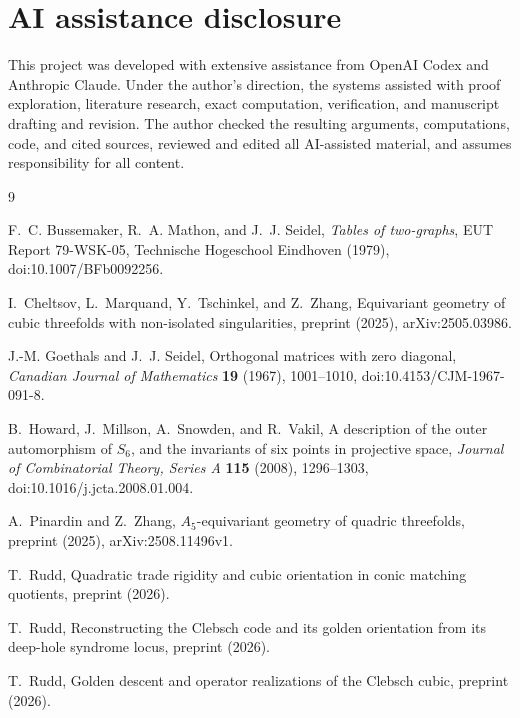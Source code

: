 \documentclass[11pt]{article}
\theoremstyle{definition}
\theoremstyle{remark}
\begin{document}
\section*{AI assistance disclosure}

This project was developed with extensive assistance from OpenAI Codex and
Anthropic Claude. Under the author's direction, the systems assisted with
proof exploration, literature research, exact computation, verification,
and manuscript drafting and revision. The author checked the resulting
arguments, computations, code, and cited sources, reviewed and edited all
AI-assisted material, and assumes responsibility for all content.

\begin{thebibliography}{9}

F.~C. Bussemaker, R.~A. Mathon, and J.~J. Seidel,
\newblock \emph{Tables of two-graphs},
\newblock EUT Report 79-WSK-05, Technische Hogeschool Eindhoven (1979),
doi:10.1007/BFb0092256.

I.~Cheltsov, L.~Marquand, Y.~Tschinkel, and Z.~Zhang,
\newblock Equivariant geometry of cubic threefolds with non-isolated
singularities,
\newblock preprint (2025), arXiv:2505.03986.

J.-M. Goethals and J.~J. Seidel,
\newblock Orthogonal matrices with zero diagonal,
\newblock \emph{Canadian Journal of Mathematics} \textbf{19} (1967),
1001--1010, doi:10.4153/CJM-1967-091-8.

B.~Howard, J.~Millson, A.~Snowden, and R.~Vakil,
\newblock A description of the outer automorphism of \(S_6\), and the
invariants of six points in projective space,
\newblock \emph{Journal of Combinatorial Theory, Series A} \textbf{115}
(2008), 1296--1303, doi:10.1016/j.jcta.2008.01.004.

A.~Pinardin and Z.~Zhang,
\newblock \(A_5\)-equivariant geometry of quadric threefolds,
\newblock preprint (2025), arXiv:2508.11496v1.

T.~Rudd,
\newblock Quadratic trade rigidity and cubic orientation in conic matching
quotients,
\newblock preprint (2026).

T.~Rudd,
\newblock Reconstructing the Clebsch code and its golden orientation from its
deep-hole syndrome locus,
\newblock preprint (2026).

T.~Rudd,
\newblock Golden descent and operator realizations of the Clebsch cubic,
\newblock preprint (2026).

\end{thebibliography}
\end{document}
